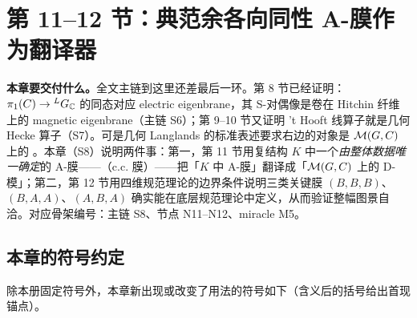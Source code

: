 
\section{第 11--12 节：典范余各向同性 A-膜作为翻译器}
\label{sec:flesh-dmod}

\begin{keyidea}
\textbf{本章要交付什么。}全文主链到这里还差最后一环。第 8 节已经证明：\(\pi_1(C)\to{}^{L}G_{\mathbb{C}}\) 的同态对应 electric eigenbrane，其 S-对偶像是卷在 Hitchin 纤维上的 magnetic eigenbrane（主链 S6）；第 9--10 节又证明 't Hooft 线算子就是几何 Hecke 算子（S7）。可是几何 Langlands 的标准表述要求右边的对象是 \(\mathcal{M}(G,C)\) 上的 。本章（S8）说明两件事：第一，第 11 节用复结构 \(K\) 中一个\emph{由整体数据唯一确定}的 A-膜——（c.c. 膜）——把「\(K\) 中 A-膜」翻译成「\(\mathcal{M}(G,C)\) 上的 D-模」；第二，第 12 节用四维规范理论的边界条件说明三类关键膜 \((B,B,B)\)、\((B,A,A)\)、\((A,B,A)\) 确实能在底层规范理论中定义，从而验证整幅图景自洽。对应骨架编号：主链 S8、节点 N11--N12、miracle M5。
\end{keyidea}

\subsection*{本章的符号约定}

除本册固定符号外，本章新出现或改变了用法的符号如下（含义后的括号给出首现锚点）。

